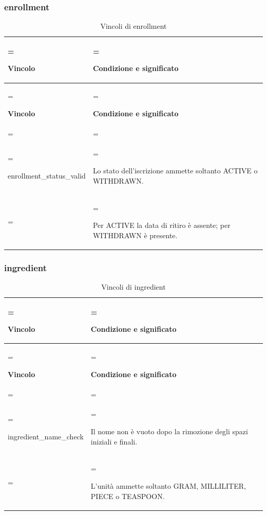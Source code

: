 \documentclass[11pt,a4paper]{article}
\begin{document}
\subsubsection{enrollment}
{\small\renewcommand{\arraystretch}{1.25}
\begin{xltabular}{\linewidth}{>{\hsize\linewidth=\hsize\raggedright\arraybackslash}X>{\hsize\linewidth=\hsize\raggedright\arraybackslash}X}
\caption{Vincoli di enrollment}\label{tab:dictionary-35}\\
\toprule
\textbf{Vincolo} & \textbf{Condizione e significato}\\\midrule\endfirsthead\toprule\textbf{Vincolo} & \textbf{Condizione e significato}\\\midrule\endhead
\midrule{}\\\endfoot\bottomrule\endlastfoot

{\ttfamily\small enrollment\_\allowbreak{}status\_\allowbreak{}valid} & Lo stato dell'iscrizione ammette soltanto ACTIVE o WITHDRAWN.\\ & Per ACTIVE la data di ritiro è assente; per WITHDRAWN è presente.\\*
\end{xltabular}}

\subsubsection{ingredient}
{\small\renewcommand{\arraystretch}{1.25}
\begin{xltabular}{\linewidth}{>{\hsize\linewidth=\hsize\raggedright\arraybackslash}X>{\hsize\linewidth=\hsize\raggedright\arraybackslash}X}
\caption{Vincoli di ingredient}\label{tab:dictionary-36}\\
\toprule
\textbf{Vincolo} & \textbf{Condizione e significato}\\\midrule\endfirsthead\toprule\textbf{Vincolo} & \textbf{Condizione e significato}\\\midrule\endhead
\midrule{}\\\endfoot\bottomrule\endlastfoot

{\ttfamily\small ingredient\_\allowbreak{}name\_\allowbreak{}check} & Il nome non è vuoto dopo la rimozione degli spazi iniziali e finali.\\ & L'unità ammette soltanto GRAM, MILLILITER, PIECE o TEASPOON.\\*
\end{xltabular}}
\end{document}
